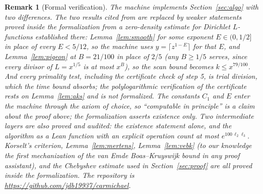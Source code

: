 \documentclass[11pt]{amsart}
\newtheorem{remark}[lemma]{Remark}
\begin{document}
\begin{remark}[Formal verification]
The machine implements Section~\ref{sec:algo} with two differences. The
two results cited from \cite{AGP} are replaced by weaker statements
proved inside the formalization from a zero-density estimate for
Dirichlet $L$-functions established there: Lemma~\ref{lem:smooth} for
some exponent $E \in (0, 1/2]$ in place of every $E < 5/12$, so the
machine uses $y = \lceil z^{1-E} \rceil$ for that $E$, and
Lemma~\ref{lem:pigeon} at $B = 21/100$ in place of $2/5$ (any
$B \ge 1/5$ serves, since every divisor of $L = x^{1/5}$ is at most
$x^{B}$), so the scan bound becomes $k \le x^{79/100}$.
And every primality test, including the certificate check of step 5, is
trial division, which the time bound absorbs; the polylogarithmic
verification of the certificate rests on Lemma~\ref{lem:aks} and is not
formalized. The constants $C_1$ and $E$ enter the machine through the
axiom of choice, so ``computable in principle'' is a claim about the
proof above; the formalization asserts existence only. Two intermediate layers are
also proved and audited: the existence statement alone, and the
algorithm as a Lean function with an explicit operation count at most
$e^{100\,\ell_2\ell_3}$. Korselt's criterion, Lemma~\ref{lem:mertens},
Lemma~\ref{lem:vebk} (to our knowledge the first mechanization of the
van Emde Boas--Kruyswijk bound in any proof assistant), and the
Chebyshev estimate used in Section~\ref{sec:proof} are all proved inside the
formalization. The repository is
\url{https://github.com/jdb19937/carmichael}.
\end{remark}
\end{document}
